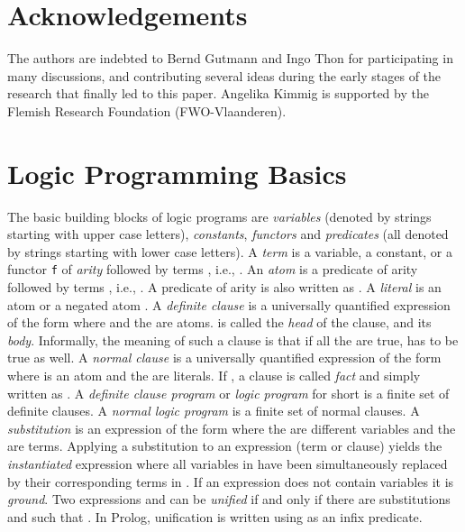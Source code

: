 \documentclass[a4paper]{article}
\begin{document}
\section*{Acknowledgements}
The authors are indebted to Bernd Gutmann and Ingo Thon
for participating in many discussions, and contributing several ideas  during the early stages of the research that finally led to this paper. 
Angelika Kimmig is supported by the Flemish Research Foundation (FWO-Vlaanderen). 







\appendix

\section{Logic Programming Basics}
\label{app:lp}
The basic building blocks of logic programs are \emph{variables} (denoted by strings starting with upper case letters), \emph{constants}, \emph{functors} and
\emph{predicates} (all denoted by strings starting with lower case letters).  A \emph{term} is a variable, a constant, or a functor
\texttt{f} of \emph{arity}  followed by  terms , i.e.,
. 
An \emph{atom} is a predicate  of arity  followed by  terms , i.e.,
. A predicate  of arity  is also written as . A \emph{literal} is an
atom or a negated atom . A \emph{definite
  clause} is a universally quantified expression of the form  where  and the  are atoms.
 is called the \emph{head} of the clause, and  its
\emph{body}. Informally, the meaning of such a clause is that if all
the  are true,  has to be true as well. 
 A
\emph{normal clause}  is a universally quantified expression of the form  where  is an atom and the  are
literals.
If , a clause is called \emph{fact} and simply written
as . A \emph{definite clause program} or \emph{logic program} for
short is a finite set of definite clauses. A \emph{normal logic
  program} is a finite set of normal clauses. 
A \emph{substitution}  is an expression of the form
 where the  are different variables and
the  are terms. Applying a substitution  to an expression
 (term or clause) yields the \emph{instantiated} expression 
where all variables  in  have been simultaneously replaced by
their corresponding terms  in . If an expression does not
contain variables it is \emph{ground}. Two expressions  and  can be \emph{unified} if and only if there are substitutions  and  such that . In Prolog, unification is written using  as an infix predicate. 
\end{document}
